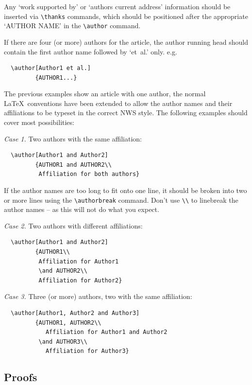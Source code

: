 \documentclass{article}
\begin{document}
Any `work supported by' or `authors current address' information should
be inserted via \verb"\thanks" commands, which should be positioned
after the appropriate `AUTHOR NAME' in the \verb"\author" command.

If there are four (or more) authors for the article, the author running head
should contain the first author name followed by `et~al.' only. e.g.
%
\begin{verbatim}
  \author[Author1 et al.]
         {AUTHOR1...}
\end{verbatim}

The previous examples show an article with one author, the normal
\LaTeX\ conventions have been extended to allow the author names and
their affiliations to be typeset in the correct NWS style. The following
examples should cover most possibilities:

\textit{Case 1.} Two authors with the same affiliation:
%
\begin{verbatim}
  \author[Author1 and Author2]
         {AUTHOR1 and AUTHOR2\\
          Affiliation for both authors}
\end{verbatim}
%
If the author names are too long to fit onto one line, it should be
broken into two or more lines using the \verb"\authorbreak" command.
Don't use \verb"\\" to linebreak the author names -- as this will not do what
you expect.

\textit{Case 2.} Two authors with different affiliations:
%
\begin{verbatim}
  \author[Author1 and Author2]
         {AUTHOR1\\
          Affiliation for Author1
          \and AUTHOR2\\
          Affiliation for Author2}
\end{verbatim}

\textit{Case 3.} Three (or more) authors, two with the same affiliation:
%
\begin{verbatim}
  \author[Author1, Author2 and Author3]
         {AUTHOR1, AUTHOR2\\
            Affiliation for Author1 and Author2
          \and AUTHOR3\\
            Affiliation for Author3}
\end{verbatim}

\subsection{Proofs}
\end{document}

